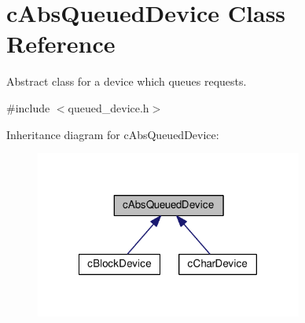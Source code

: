 \hypertarget{classcAbsQueuedDevice}{\section{c\-Abs\-Queued\-Device \-Class \-Reference}
\label{d7/d38/classcAbsQueuedDevice}
}


\-Abstract class for a device which queues requests.  




{\ttfamily \#include $<$queued\-\_\-device.\-h$>$}



\-Inheritance diagram for c\-Abs\-Queued\-Device\-:\nopagebreak
\begin{figure}[H]
\begin{center}
\leavevmode
\includegraphics[width=249pt]{d3/d40/classcAbsQueuedDevice__inherit__graph}
\end{center}
\end{figure}
